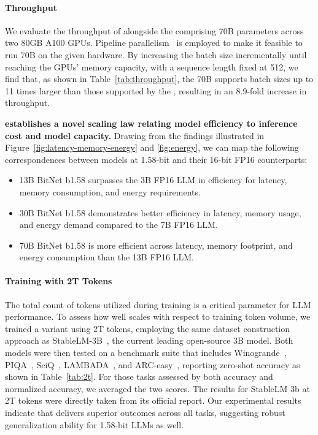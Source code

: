 \paragraph{Throughput}

We evaluate the throughput of  alongside the  comprising 70B parameters across two 80GB A100 GPUs. Pipeline parallelism~\cite{gpipe} is employed to make it feasible to run  70B on the given hardware. By increasing the batch size incrementally until reaching the GPUs' memory capacity, with a sequence length fixed at 512, we find that, as shown in Table~\ref{tab:throughput}, the  70B supports batch sizes up to 11 times larger than those supported by the , resulting in an 8.9-fold increase in throughput.

\textbf{ establishes a novel scaling law relating model efficiency to inference cost and model capacity.} Drawing from the findings illustrated in Figure~\ref{fig:latency-memory-energy} and \ref{fig:energy}, we can map the following correspondences between models at 1.58-bit and their 16-bit FP16 counterparts:

\begin{itemize}
    \item 13B BitNet b1.58 surpasses the 3B FP16 LLM in efficiency for latency, memory consumption, and energy requirements.
    \item 30B BitNet b1.58 demonstrates better efficiency in latency, memory usage, and energy demand compared to the 7B FP16 LLM.
    \item 70B BitNet b1.58 is more efficient across latency, memory footprint, and energy consumption than the 13B FP16 LLM.
\end{itemize}

\paragraph{Training with 2T Tokens}

The total count of tokens utilized during training is a critical parameter for LLM performance. To assess how well  scales with respect to training token volume, we trained a  variant using 2T tokens, employing the same dataset construction approach as StableLM-3B~\cite{StableLM-3B-4E1T}, the current leading open-source 3B model. Both models were then tested on a benchmark suite that includes Winogrande~\cite{winoGrande}, PIQA~\cite{piqa}, SciQ~\cite{sciq}, LAMBADA~\cite{lambada}, and ARC-easy~\cite{arc}, reporting zero-shot accuracy as shown in Table~\ref{tab:2t}. For those tasks assessed by both accuracy and normalized accuracy, we averaged the two scores. The results for StableLM 3b at 2T tokens were directly taken from its official report. Our experimental results indicate that  delivers superior outcomes across all tasks, suggesting robust generalization ability for 1.58-bit LLMs as well.

